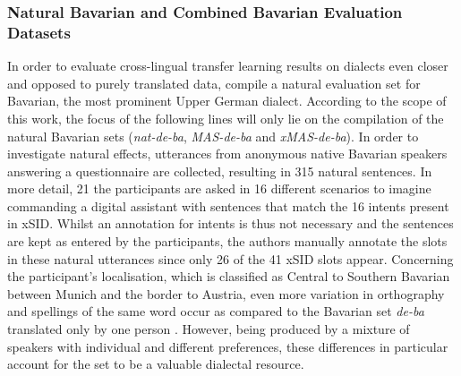 \documentclass[11pt,a4paper,twoside,openright]{scrbook}
\begin{document}
\subsubsection{Natural Bavarian and Combined Bavarian Evaluation Datasets}

In order to evaluate cross-lingual transfer learning results on dialects even closer and opposed to purely translated data, \citet{winkler-etal-2024-slot-intent} compile a natural evaluation set for Bavarian, the most prominent Upper German dialect. According to the scope of this work, the focus of the following lines will only lie on the compilation of the natural Bavarian sets (\textit{nat-de-ba}, \textit{MAS-de-ba} and \textit{xMAS-de-ba}). In order to investigate natural effects, utterances from anonymous native Bavarian speakers answering a questionnaire are collected, resulting in 315 natural sentences. In more detail, 21 the participants are asked in 16 different scenarios to imagine commanding a digital assistant with sentences that match the 16 intents present in xSID. Whilst an annotation for intents is thus not necessary and the sentences are kept as entered by the participants, the authors manually annotate the slots in these natural utterances since only 26 of the 41 xSID slots appear. Concerning the participant's localisation, which is classified as Central to Southern Bavarian between Munich and the border to Austria, even more variation in orthography and spellings of the same word occur as compared to the Bavarian set \textit{de-ba} translated only by one person \citep{winkler-etal-2024-slot-intent}. However, being produced by a mixture of speakers with individual and different preferences, these differences in particular account for the set to be a valuable dialectal resource. 
\end{document}
